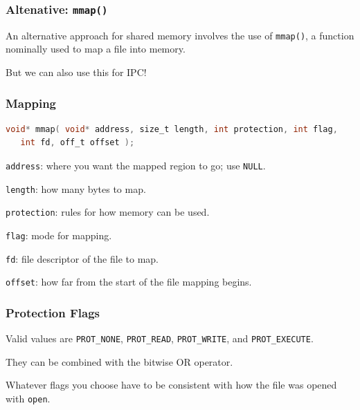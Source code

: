 \begin{frame}
	\frametitle{Altenative: \texttt{mmap()}}

	An alternative approach for shared memory involves the use of \texttt{mmap()}, a function nominally used to map a file into memory.

	But we can also use this for IPC!

\end{frame}


\begin{frame}[fragile]
	\frametitle{Mapping}
	\begin{lstlisting}[language=C]
void* mmap( void* address, size_t length, int protection, int flag,
   int fd, off_t offset );
\end{lstlisting}

	\texttt{address}: where you want the mapped region to go; use \texttt{NULL}.

	\texttt{length}: how many bytes to map.

	\texttt{protection}: rules for how memory can be used.

	\texttt{flag}: mode for mapping.

	\texttt{fd}: file descriptor of the file to map.

	\texttt{offset}: how far from the start of the file mapping begins.

\end{frame}


\begin{frame}
	\frametitle{Protection Flags}

	Valid values are \texttt{PROT\_NONE}, \texttt{PROT\_READ}, \texttt{PROT\_WRITE}, and \texttt{PROT\_EXECUTE}.

	They can be combined with the bitwise OR operator.

	Whatever flags you choose have to be consistent with how the file was opened with \texttt{open}.

\end{frame}


